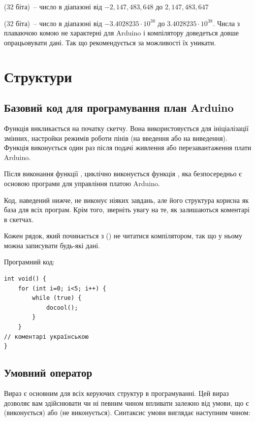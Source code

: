\documentclass[12pt,a4paper]{report}  %
\begin{document}
     (32 біта)~--  число в діапазоні від $-2,147,483,648$ до $2,147,483,647$
    
     (32 біта)~--  число в діапазоні від $-3.4028235\cdot 10^{38}$ до $3.4028235\cdot 10^{38}$. Числа з плаваючою комою не характерні для Arduino і компілятору доведеться довше опрацьовувати дані. Так що рекомендується за можливості їх уникати.


\section{Структури}

\subsection{Базовий код для програмування план Arduino}
Функція   викликається на початку скетчу. Вона використовується для ініціалізації змінних, настройки режимів роботи пінів (на введення або на виведення). Функція  виконується один раз після подачі живлення або перезавантаження плати Arduino.

Після виконання функції , циклічно виконується функція , яка безпосередньо є основою програми для управління платою Arduino.

Код, наведений нижче, не виконує ніяких завдань, але його структура корисна як база для всіх програм. Крім того, зверніть увагу на те, як залишаються коментарі в скетчах.

Кожен рядок, який починається з (\code{//}) не читатися компілятором, так що у ньому можна записувати будь-які дані.


\newpage

Програмний код:

\begin{lstlisting}[label=some-code,caption=Структура програми]
int void() {
	for (int i=0; i<5; i++) {
		while (true) {
			docool();		
		}	
	}
// коментарі українською
}
\end{lstlisting}	

\subsection{Умовний оператор}

Вираз  є основним для всіх керуючих структур в програмуванні. Цей вираз дозволяє вам здійснювати чи ні певним чином впливати залежно від умови, що є  (виконується) або  (не виконується). Синтаксис умови  виглядає наступним чином:
\end{document}
